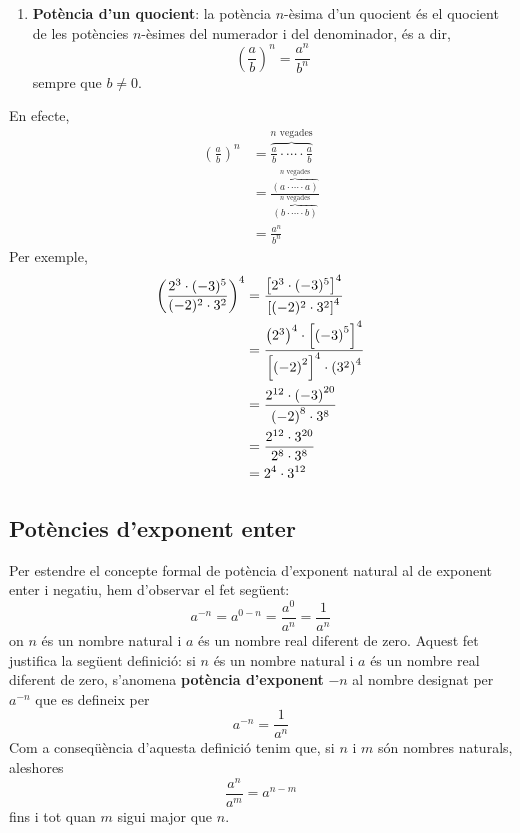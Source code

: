 \begin{enumerate}
\item[5.] \textbf{Potència d’un quocient}: la potència $n$-èsima d’un
quocient és el quocient de les potències $n$-èsimes del numerador i del
denominador, és a dir,%
\begin{equation*}
\left( \frac{a}{b}\right) ^{n}=\frac{a^{n}}{b^{n}}
\end{equation*}%
sempre que $b\neq 0$.
\end{enumerate}

En efecte,%
\begin{align*}
\left( \frac{a}{b}\right) ^{n} &=\overset{n\text{ vegades}}{\overbrace{\frac{a%
}{b}\cdot \cdots \cdot \frac{a}{b}}} \\
&=\frac{\overset{n\text{ vegades}}{\overbrace{\left( a\cdot \cdots \cdot
a\right) }}}{\overset{n\text{ vegades}}{\overbrace{\left( b\cdot \cdots \cdot
b\right) }}} \\
&=\frac{a^{n}}{b^{n}}
\end{align*}%
Per exemple,%
\begin{align*}
\left( \frac{2^{3}\cdot (-3)^{5}}{(-2)^{2}\cdot 3^{2}}\right) ^{4} &=\frac{%
\left[ 2^{3}\cdot (-3)^{5}\right] ^{4}}{\left[ (-2)^{2}\cdot 3^{2}\right]
^{4}} \\
&=\frac{\left( 2^{3}\right) ^{4}\cdot \left[ \left( -3\right) ^{5}\right]
^{4}}{\left[ \left( -2\right) ^{2}\right] ^{4}\cdot \left( 3^{2}\right) ^{4}}
\\
&=\frac{2^{12}\cdot \left( -3\right) ^{20}}{\left( -2\right) ^{8}\cdot 3^{8}%
} \\
&=\frac{2^{12}\cdot 3^{20}}{2^{8}\cdot 3^{8}} \\
&=2^{4}\cdot 3^{12}
\end{align*}

\subsection{Potències d’exponent enter}

Per estendre el concepte formal de potència d’exponent natural al de
exponent enter i negatiu, hem d’observar el fet següent:%
\begin{equation*}
a^{-n}=a^{0-n}=\frac{a^{0}}{a^{n}}=\frac{1}{a^{n}}
\end{equation*}%
on $n$ és un nombre natural i $a$ és un nombre real diferent de
zero. Aquest fet justifica la següent definició: si $n$ és un nombre natural i $a$ és un nombre real diferent de zero, s’anomena \textbf{%
potència d’exponent }$-n$ al nombre designat per $a^{-n}$ que es
defineix per%
\begin{equation*}
a^{-n}=\frac{1}{a^{n}}
\end{equation*}%
Com a conseqüència d’aquesta definició tenim que, si $n$ i $m$ són nombres naturals, aleshores%
\begin{equation*}
\frac{a^{n}}{a^{m}}=a^{n-m}
\end{equation*}%
fins i tot quan $m$ sigui major que $n$.

